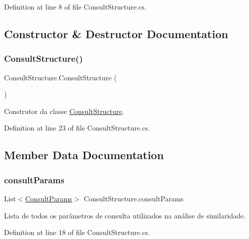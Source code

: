 Definition at line 8 of file Consult\+Structure.\+cs.



\subsection{Constructor \& Destructor Documentation}
\hypertarget{class_consult_structure_a187faa0426546ce6251903a0064cf8a1}{}\label{class_consult_structure_a187faa0426546ce6251903a0064cf8a1} 
\subsubsection{\texorpdfstring{Consult\+Structure()}{ConsultStructure()}}
{\footnotesize\ttfamily Consult\+Structure.\+Consult\+Structure (\begin{DoxyParamCaption}{ }\end{DoxyParamCaption})}



Construtor da classe \hyperlink{class_consult_structure}{Consult\+Structure}. 



Definition at line 23 of file Consult\+Structure.\+cs.



\subsection{Member Data Documentation}
\hypertarget{class_consult_structure_a56fa08cf2668d390c41bb101d7fb9d40}{}\label{class_consult_structure_a56fa08cf2668d390c41bb101d7fb9d40} 
\subsubsection{\texorpdfstring{consult\+Params}{consultParams}}
{\footnotesize\ttfamily List$<$\hyperlink{class_consult_params}{Consult\+Params}$>$ Consult\+Structure.\+consult\+Params}



Lista de todos os parâmetros de consulta utilizados na análise de similaridade. 



Definition at line 18 of file Consult\+Structure.\+cs.

